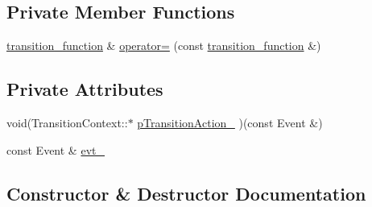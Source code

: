 \subsection*{Private Member Functions}
\begin{DoxyCompactItemize}
\item 
\mbox{\hyperlink{classboost_1_1statechart_1_1detail_1_1transition__function}{transition\+\_\+function}} \& \mbox{\hyperlink{classboost_1_1statechart_1_1detail_1_1transition__function_a7ef5049fdc638389bc59dfd8d1c4dab1}{operator=}} (const \mbox{\hyperlink{classboost_1_1statechart_1_1detail_1_1transition__function}{transition\+\_\+function}} \&)
\end{DoxyCompactItemize}
\subsection*{Private Attributes}
\begin{DoxyCompactItemize}
\item 
void(Transition\+Context\+::$\ast$ \mbox{\hyperlink{classboost_1_1statechart_1_1detail_1_1transition__function_a33ea5026ee41a5a9d03ebac6eaa33a60}{p\+Transition\+Action\+\_\+}} )(const Event \&)
\item 
const Event \& \mbox{\hyperlink{classboost_1_1statechart_1_1detail_1_1transition__function_a161632f44a80b8df7ea554b727cc3713}{evt\+\_\+}}
\end{DoxyCompactItemize}


\subsection{Constructor \& Destructor Documentation}
\mbox{\label{classboost_1_1statechart_1_1detail_1_1transition__function_a9ef040fb0285fc8943484b427a38153b}} 

